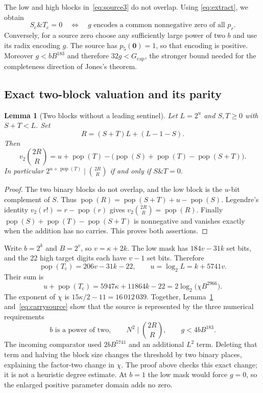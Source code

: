 \documentclass[11pt]{article}
\newcommand{\pop}{\operatorname{pop}}
\newcommand{\Gcap}{G_{\mathrm{cap}}}
\newcommand{\Sc}{S_{\mathrm c}}
\newcommand{\Tc}{T_{\mathrm c}}
\newtheorem{lemma}[theorem]{Lemma}
\theoremstyle{remark}\newtheorem{remark}[theorem]{Remark}
\begin{document}
The low and high blocks in~\eqref{eq:source3} do not overlap. Using
\eqref{eq:extract}, we obtain
\begin{equation}\label{eq:carrysource}
 \Sc\mathbin{\&}\Tc=0
 \quad\Longleftrightarrow\quad
 g\text{ encodes a common nonnegative zero of all }p_r.
\end{equation}
Conversely, for a source zero choose any sufficiently large power of two
$b$ and use its radix encoding $g$. The source has $p_5(\mathbf0)=1$,
so that encoding is positive. Moreover $g<bB^{183}$ and therefore
$32g<\Gcap$, the stronger bound needed for the completeness direction of
Jones's theorem.

\subsection{Exact two-block valuation and its parity}

\begin{lemma}[Two blocks without a leading sentinel]\label{lem:twoblock}
Let $L=2^u$ and $S,T\geq0$ with $S+T<L$. Set
\[
 R=(S+T)L+(L-1-S).
\]
Then
\[
 v_2\binom{2R}{R}
 =u+\pop(T)-\bigl(\pop(S)+\pop(T)-\pop(S+T)\bigr).
\]
In particular $2^{u+\pop(T)}\mid\binom{2R}{R}$ if and only if $S\&T=0$.
\end{lemma}
\begin{proof}
The two binary blocks do not overlap, and the low block is the $u$-bit
complement of $S$. Thus $\pop(R)=\pop(S+T)+u-\pop(S)$.
Legendre's identity $v_2(r!)=r-\pop(r)$ gives
$v_2\binom{2R}{R}=\pop(R)$. Finally
$\pop(S)+\pop(T)-\pop(S+T)$ is nonnegative and vanishes exactly when
the addition has no carries. This proves both assertions.
\end{proof}

Write $b=2^k$ and $B=2^v$, so $v=\kappa+2k$. The low mask has
$184v-31k$ set bits, and the 22 high target digits each have $v-1$ set
bits. Therefore
\[
 \pop(\Tc)=206v-31k-22,\qquad
 u=\log_2 L=k+5741v.
\]
Their sum is
\begin{equation}\label{eq:threshold}
 u+\pop(\Tc)=5947\kappa+11864k-22
       =2\log_2\bigl(\chi B^{2966}\bigr).
\end{equation}
The exponent of $\chi$ is $15\kappa/2-11=16\,012\,039$.
Together, Lemma~\ref{lem:twoblock} and~\eqref{eq:carrysource} show that
the source is represented by the three numerical requirements
\[
 b\text{ is a power of two},\qquad
 N^2\mid\binom{2R}{R},\qquad g<4bB^{183}.
\]
The incoming comparator used $2bB^{5741}$ and an additional $L^2$ term.
Deleting that term and halving the block size changes the threshold by
two binary places, explaining the factor-two change in $\chi$.
The proof above checks this exact change; it is not a heuristic degree
estimate. At $b=1$ the low mask would force $g=0$, so the enlarged positive
parameter domain adds no zero.
\end{document}
